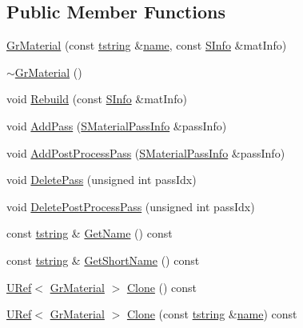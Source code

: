 \begin{CompactItemize}
\subsection*{Public Member Functions}
\begin{CompactItemize}
\item 
\hyperlink{class_gr_material_8bbcfb4cdb8c56150d2b4142619e7b98}{GrMaterial} (const \hyperlink{common__afx_8h_816fa58fd77499b0edb2c69ebe803d5c}{tstring} \&\hyperlink{glext__bak_8h_bb62efe59ccdd153ce42e1a418352209}{name}, const \hyperlink{struct_gr_material_1_1_s_info}{SInfo} \&matInfo)
\item 
\hyperlink{class_gr_material_ee72e9c9a2cff2ecb9d7db20a415e10b}{$\sim$GrMaterial} ()
\item 
void \hyperlink{class_gr_material_c259581fc8c8a6485d0a103a6007271b}{Rebuild} (const \hyperlink{struct_gr_material_1_1_s_info}{SInfo} \&matInfo)
\item 
void \hyperlink{class_gr_material_1e2106f701778cdda09a4f9d2618d664}{AddPass} (\hyperlink{struct_s_material_pass_info}{SMaterialPassInfo} \&passInfo)
\item 
void \hyperlink{class_gr_material_694068e7681feea901fe455e15008f6b}{AddPostProcessPass} (\hyperlink{struct_s_material_pass_info}{SMaterialPassInfo} \&passInfo)
\item 
void \hyperlink{class_gr_material_81b2787260c41c2581a762b04cc6c3f4}{DeletePass} (unsigned int passIdx)
\item 
void \hyperlink{class_gr_material_fc785b8aa612256266c37eb1d482f287}{DeletePostProcessPass} (unsigned int passIdx)
\item 
const \hyperlink{common__afx_8h_816fa58fd77499b0edb2c69ebe803d5c}{tstring} \& \hyperlink{class_gr_material_f795daba144a86beb2d2baa22bc69b44}{GetName} () const 
\item 
const \hyperlink{common__afx_8h_816fa58fd77499b0edb2c69ebe803d5c}{tstring} \& \hyperlink{class_gr_material_b90ae0e999f14823f9aeebd447a52fd8}{GetShortName} () const 
\item 
\hyperlink{class_u_ref}{URef}$<$ \hyperlink{class_gr_material}{GrMaterial} $>$ \hyperlink{class_gr_material_1eb04141be03a81d722d927286f9b6b3}{Clone} () const 
\item 
\hyperlink{class_u_ref}{URef}$<$ \hyperlink{class_gr_material}{GrMaterial} $>$ \hyperlink{class_gr_material_24474e6210348ad3a58ae6032238fc1b}{Clone} (const \hyperlink{common__afx_8h_816fa58fd77499b0edb2c69ebe803d5c}{tstring} \&\hyperlink{glext__bak_8h_bb62efe59ccdd153ce42e1a418352209}{name}) const 

\end{CompactItemize}
\end{CompactItemize}
